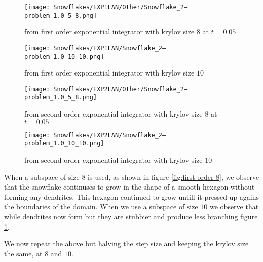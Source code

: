 \begin{figure}[H]
    \centering
    \begin{minipage}{0.49\textwidth}
        \texttt{[image: Snowflakes/EXP1LAN/Other/Snowflake\_2--problem\_1.0\_5\_8.png]} %
        \caption{from first order exponential integrator with krylov size $8$ at $t=0.05$}
        \label{fig:first order 8}
    \end{minipage}\hfill
    \centering
    \begin{minipage}{0.49\textwidth}
        \texttt{[image: Snowflakes/EXP1LAN/Snowflake\_2--problem\_1.0\_10\_10.png]} %
        \caption{from first order exponential integrator with krylov size $10$}
        \label{fig:first order 10}
    \end{minipage}\hfill
\end{figure}
\begin{figure}[H]
    \centering
    \begin{minipage}{0.49\textwidth}
        \texttt{[image: Snowflakes/EXP2LAN/Other/Snowflake\_2--problem\_1.0\_5\_8.png]} %
        \caption{from second order exponential integrator with krylov size $8$ at $t=0.05$}
        \label{fig:second order 8}
    \end{minipage}\hfill
    \centering
    \begin{minipage}{0.49\textwidth}
        \texttt{[image: Snowflakes/EXP2LAN/Snowflake\_2--problem\_1.0\_10\_10.png]} %
        \caption{from second order exponential integrator with krylov size $10$}
        \label{fig:second order 10}
    \end{minipage}\hfill
\end{figure}

When a subspace of size $8$ is used, as shown in figure \ref{fig:first order 8},
we observe that the snowflake continuses to grow in the shape of a smooth hexagon without forming any dendrites.
This hexagon continued to grow untill it pressed up agains the boundaries of the domain.
When we use a subspace of size $10$ we observe that while dendrites now form but they are stubbier and produce less branching figure \ref{fig:first order 10}.

We now repeat the above but halving the step size and keeping the krylov size the same, at $8$ and $10$.

